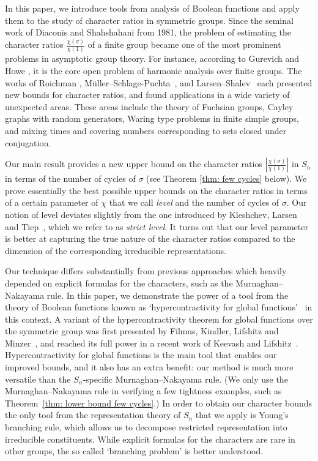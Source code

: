 \documentclass[11pt, letterpaper]{amsart}
\begin{document}
In this paper, we introduce tools from analysis of Boolean functions and apply them to the study of character ratios in symmetric groups. Since the seminal work of Diaconis and Shahshahani \cite{diaconis1981generating} from 1981, the problem of estimating the character ratios $\frac{\chi(\sigma)}{\chi(1)}$ of a finite group became one of the most prominent problems in asymptotic group theory. For instance, according to Gurevich and Howe \cite{gurevich2021harmonic}, it is the core open problem of harmonic analysis over finite groups. The works of Roichman \cite{roichman1996upper}, M\"{u}ller--Schlage-Puchta~\cite{muller2007character}, and Larsen--Shalev~\cite{larsen2008characters} each presented new bounds for character ratios, and found applications in a wide variety of unexpected areas. These areas include the theory of Fuchsian groups, Cayley graphs with random generators, Waring type problems in finite simple groups, and mixing times and covering numbers corresponding to sets closed under conjugation.

Our main result provides a new upper bound on the character ratios $\left|\frac{\chi(\sigma)}{\chi(1)}\right|$ in $S_n$ in terms of the number of cycles of $\sigma$ (see Theorem \ref{thm: few cycles} below). We prove essentially the best possible upper bounds on the character ratios in terms of a certain parameter of $\chi$ that we call \emph{level} and the number of cycles of $\sigma$. Our notion of level deviates slightly from the one introduced by Kleshchev, Larsen and Tiep~\cite{kleshchev2022level}, which we refer to as \emph{strict level}. It turns out that our level parameter is better at capturing the true nature of the character ratios compared to the dimension of the corresponding irreducible representations.

Our technique differs substantially from previous approaches which heavily depended on explicit formulas for the characters, such as the Murnaghan--Nakayama rule.
In this paper, we demonstrate the power of a tool from the theory of Boolean functions known as `hypercontractivity for global functions'~\cite{keevash2021global,khot2018pseudorandom} in this context. A variant of the hypercontractivity theorem for global functions over the symmetric group was first presented by Filmus, Kindler, Lifshitz and Minzer~\cite{filmus2020hypercontractivity}, and reached its full power in a recent work of Keevash and Lifshitz~\cite{keevash2023sharp}.
Hypercontractivity for global functions is the main tool that enables our improved bounds, and it also has an extra benefit: our method is much more versatile than the $S_n$-specific Murnaghan--Nakayama rule. (We only use the Murnaghan--Nakayama rule in verifying a few tightness examples, such as Theorem~\ref{thm: lower bound few cycles}.) In order to obtain our character bounds the only tool from the representation theory of $S_n$ that we apply is
Young's branching rule, which allows us to decompose restricted representation into irreducible constituents. While explicit formulas for the characters are rare in other groups, the so called `branching problem' is better understood.
\end{document}
